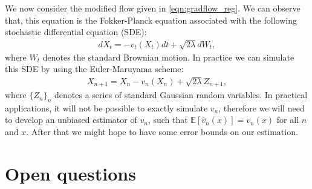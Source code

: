 \documentclass{article}
\begin{document}
We now consider the modified flow given in \eqref{eqn:gradflow_reg}. We can observe that, this equation is the Fokker-Planck equation associated with the following stochastic differential equation (SDE):
\begin{align}
d X_t = - v_t(X_t) dt + \sqrt{2 \lambda } d W_t,
\end{align}
where $W_t$ denotes the standard Brownian motion. In practice we can simulate this SDE by using the Euler-Maruyama scheme:
\begin{align}
X_{n+1} = X_n - v_n(X_n) + \sqrt{2 \lambda} Z_{n+1},
\end{align}
where $\{Z_n\}_{n}$ denotes a series of standard Gaussian random variables. In practical applications, it will not be possible to exactly simulate $v_n$, therefore we will need to develop an unbiased estimator of $v_n$, such that $\mathbb{E}[\hat{v}_n (x)] = v_n(x)$ for all $n$ and $x$. After that we might hope to have some error bounds on our estimation.


\section{Open questions}
\end{document}
